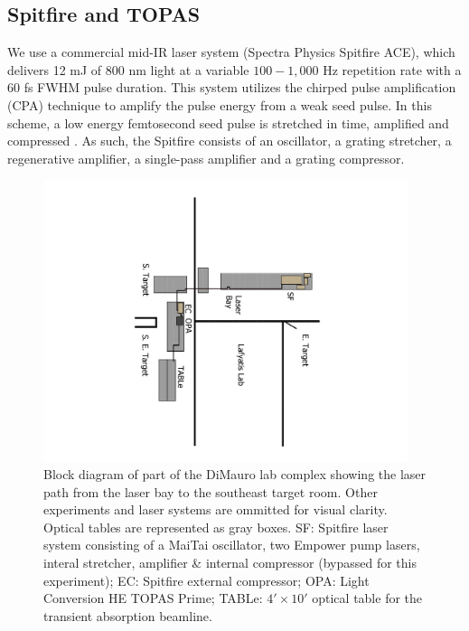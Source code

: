 \subsection{Spitfire and TOPAS}

We use a commercial mid-IR laser system (Spectra Physics Spitfire ACE), which delivers 12 mJ of 800 nm light at a variable $100 - 1,000$ Hz repetition rate with a 60 fs FWHM pulse duration. This system utilizes the chirped pulse amplification (CPA) technique to amplify the pulse energy from a weak seed pulse. In this scheme, a low energy femtosecond seed pulse is stretched in time, amplified and compressed \cite{stricklandCompressionAmplifiedChirped1985}. As such, the Spitfire consists of an oscillator, a grating stretcher, a regenerative amplifier, a single-pass amplifier and a grating compressor.

\begin{figure}
	\centering
	\includegraphics[width=0.95\textwidth,angle=90]{figures/chap2/beam_routing2.pdf}
	\caption{Block diagram of part of the DiMauro lab complex showing the laser path from the laser bay to the southeast target room. Other experiments and laser systems are ommitted for visual clarity. Optical tables are represented as gray boxes. SF: Spitfire laser system consisting of a MaiTai oscillator, two Empower pump lasers, interal stretcher, amplifier \& internal compressor (bypassed for this experiment); EC: Spitfire external compressor; OPA: Light Conversion HE TOPAS Prime; TABLe: $4' \times 10'$ optical table for the transient absorption beamline.}
	\label{fig:beam_routing}
\end{figure}

